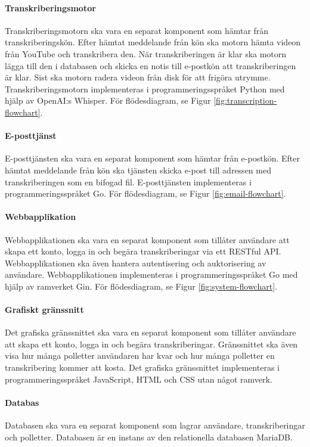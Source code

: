 \paragraph{Transkriberingsmotor}
Transkriberingsmotorn ska vara en separat komponent som hämtar från
transkriberingskön. Efter hämtat meddelande från kön ska motorn hämta videon
från YouTube och transkribera den. När transkriberingen är klar ska motorn
lägga till den i databasen och skicka en notis till e-postkön att
transkriberingen är klar. Sist ska motorn radera videon från disk för att
frigöra utrymme. Transkriberingsmotorn implementeras i programmeringsspråket
Python med hjälp av OpenAI:s Whisper. För flödesdiagram, se Figur
\ref{fig:transcription-flowchart}.

\paragraph{E-posttjänst}
E-posttjänsten ska vara en separat komponent som hämtar från e-postkön. Efter
hämtat meddelande från kön ska tjänsten skicka e-post till adressen med
transkriberingen som en bifogad fil. E-posttjänsten implementeras i
programmeringsspråket Go. För flödesdiagram, se Figur
\ref{fig:email-flowchart}.

\paragraph{Webbapplikation}
Webbapplikationen ska vara en separat komponent som tillåter användare att
skapa ett konto, logga in och begära transkriberingar via ett RESTful API.
Webbapplikationen ska även hantera autentisering och auktorisering av
användare. Webbapplikationen implementeras i programmeringsspråket Go med
hjälp av ramverket Gin. För flödesdiagram, se Figur \ref{fig:system-flowchart}.

\paragraph{Grafiskt gränssnitt}
Det grafiska gränssnittet ska vara en separat komponent som tillåter användare
att skapa ett konto, logga in och begära transkriberingar. Gränssnittet ska
även visa hur många polletter användaren har kvar och hur många polletter en
transkribering kommer att kosta. Det grafiska gränssnittet implementeras i
programmeringsspråket JavaScript, HTML och CSS utan något ramverk.

\paragraph{Databas}
Databasen ska vara en separat komponent som lagrar användare, transkriberingar
och polletter. Databasen är en instans av den relationella databasen MariaDB.

